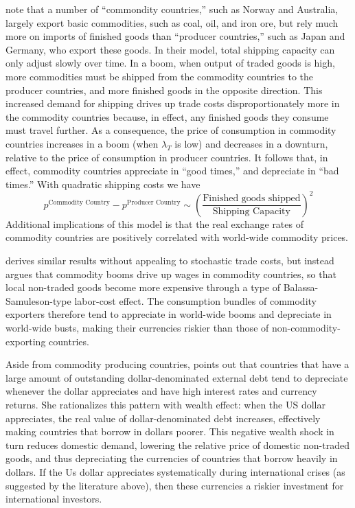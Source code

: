 \documentclass{ar-1col}
\begin{document}
\citet{Readyetal2013} note that a number of ``commondity countries,'' such as Norway and Australia, largely export basic commodities, such as coal, oil, and iron ore, but rely much more on imports of finished goods than ``producer countries,'' such as Japan and Germany, who export these goods. In their model, total shipping capacity can only adjust slowly over time. In a boom, when output of traded goods is high, more commodities must be shipped from the commodity countries to the producer countries, and more finished goods in the opposite direction. This increased demand for shipping drives up trade costs disproportionately more in the commodity countries because, in effect, any finished goods they consume must travel further. As a consequence, the price of consumption in commodity countries increases in a boom (when $\lambda_T$ is low) and decreases in a downturn, relative to the price of consumption in producer countries. It follows that, in effect, commodity countries appreciate in ``good times,'' and depreciate in ``bad times.'' With quadratic shipping costs we have
\begin{equation*}
  p^{\text{Commodity Country}}-p^{\text{Producer Country}}\sim\left(\frac{\text{Finished goods shipped}}{\text{Shipping Capacity}}\right)^2
\end{equation*}
Additional implications of this model is that the real exchange rates of commodity countries are positively correlated with world-wide commodity prices. 

\citet{Powers2015} derives similar results without appealing to stochastic trade costs, but instead argues that commodity booms drive up wages in commodity countries, so that local non-traded goods become more expensive through a type of Balassa-Samuleson-type labor-cost effect. The consumption bundles of commodity exporters therefore tend to appreciate in world-wide booms and depreciate in world-wide busts, making their currencies riskier than those of non-commodity-exporting countries.

Aside from commodity producing countries, \citet{Wiriadinata2020} points out that countries that have a large amount of outstanding dollar-denominated external debt tend to depreciate whenever the dollar appreciates and have high interest rates and currency returns. She rationalizes this pattern with wealth effect: when the US dollar appreciates, the real value of dollar-denominated debt increases, effectively making countries that borrow in dollars poorer. This negative wealth shock in turn reduces domestic demand, lowering the relative price of domestic non-traded goods, and thus depreciating the currencies of countries that borrow heavily in dollars. If the Us dollar appreciates systematically during international crises (as suggested by the literature above), then these currencies a riskier investment for international investors.
\end{document}
